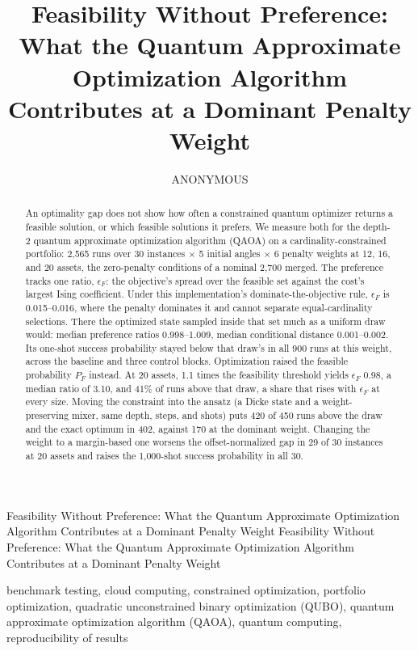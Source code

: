\documentclass{ieeeaccess}
\begin{document}

\title{Feasibility Without Preference: What the Quantum Approximate Optimization Algorithm Contributes at a Dominant Penalty Weight}
\author{\uppercase{Anonymous}}

\markboth
{Feasibility Without Preference: What the Quantum Approximate Optimization Algorithm Contributes at a Dominant Penalty Weight}
{Feasibility Without Preference: What the Quantum Approximate Optimization Algorithm Contributes at a Dominant Penalty Weight}




\begin{abstract}
An optimality gap does not show how often a constrained quantum optimizer returns a feasible solution, or which feasible solutions it prefers. We measure both for the depth-2 quantum approximate optimization algorithm (QAOA) on a cardinality-constrained portfolio: 2,565 runs over 30 instances $\times$ 5 initial angles $\times$ 6 penalty weights at 12, 16, and 20 assets, the zero-penalty conditions of a nominal 2,700 merged. The preference tracks one ratio, $\epsilon_{F}$: the objective's spread over the feasible set against the cost's largest Ising coefficient. Under this implementation's dominate-the-objective rule, $\epsilon_{F}$ is 0.015--0.016, where the penalty dominates it and cannot separate equal-cardinality selections. There the optimized state sampled inside that set much as a uniform draw would: median preference ratios 0.998--1.009, median conditional distance 0.001--0.002. Its one-shot success probability stayed below that draw's in all 900 runs at this weight, across the baseline and three control blocks. Optimization raised the feasible probability $P_{F}$ instead. At 20 assets, 1.1 times the feasibility threshold yields $\epsilon_{F}$ 0.98, a median ratio of 3.10, and 41\% of runs above that draw, a share that rises with $\epsilon_{F}$ at every size. Moving the constraint into the ansatz (a Dicke state and a weight-preserving mixer, same depth, steps, and shots) puts 420 of 450 runs above the draw and the exact optimum in 402, against 170 at the dominant weight. Changing the weight to a margin-based one worsens the offset-normalized gap in 29 of 30 instances at 20 assets and raises the 1,000-shot success probability in all 30.
\end{abstract}

\begin{keywords}
benchmark testing, cloud computing, constrained optimization, portfolio optimization, quadratic unconstrained binary optimization (QUBO), quantum approximate optimization algorithm (QAOA), quantum computing, reproducibility of results
\end{keywords}
\end{document}
